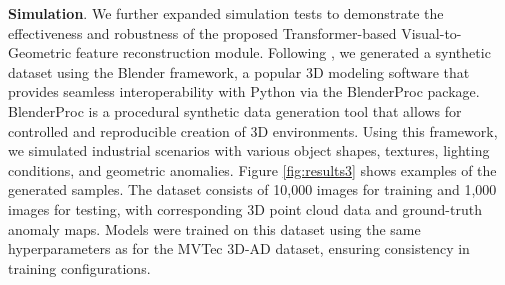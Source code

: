 \textbf{Simulation}. We further expanded simulation tests to demonstrate the effectiveness and robustness of the proposed Transformer-based Visual-to-Geometric feature reconstruction module. Following \cite{bonfiglioli2022eyecandies}, we generated a synthetic dataset using the Blender framework, a popular 3D modeling software that provides seamless interoperability with Python via the BlenderProc package. BlenderProc is a procedural synthetic data generation tool that allows for controlled and reproducible creation of 3D environments. Using this framework, we simulated industrial scenarios with various object shapes, textures, lighting conditions, and geometric anomalies. Figure \ref{fig:results3} shows examples of the generated samples. The dataset consists of 10,000 images for training and 1,000 images for testing, with corresponding 3D point cloud data and ground-truth anomaly maps. Models were trained on this dataset using the same hyperparameters as for the MVTec 3D-AD dataset, ensuring consistency in training configurations.

